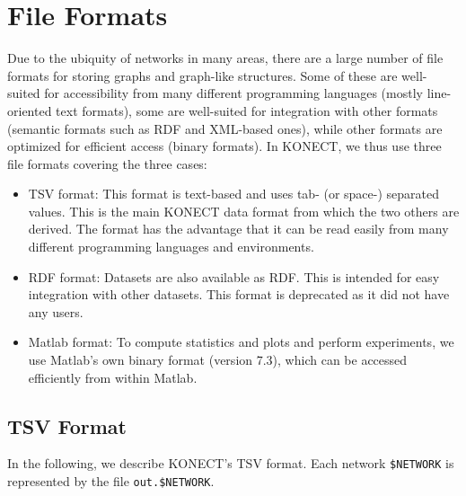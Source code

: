 \documentclass{article}
\begin{document}
\section{File Formats}
\label{sec:format}
Due to the ubiquity of networks in many areas, there are a large number
of file formats for storing graphs and graph-like structures.  Some of
these are well-suited for accessibility from many different programming
languages (mostly line-oriented text formats), some are well-suited for
integration with other formats (semantic formats such as RDF and
XML-based ones), while other formats are optimized for efficient access
(binary formats).  In KONECT, we thus use three file formats covering
the three cases:
\begin{itemize}
\item TSV format: This format is text-based and uses tab- (or space-) separated 
  values.  This is the main KONECT data format from which the two others
  are derived.  The format has the advantage that it can be read easily
  from many different programming languages and environments.
\item RDF format: Datasets are also available as RDF.  This is intended
  for easy integration with other datasets.  This format is deprecated
  as it did not have any users. 
\item Matlab format: To compute statistics and plots and perform
  experiments, we use Matlab's own binary format (version 7.3), which can be accessed
  efficiently from within Matlab.
\end{itemize}

\subsection{TSV Format}
In the following, we describe KONECT's TSV format.  Each network
\texttt{\$NETWORK} is represented by the file \texttt{out.\$NETWORK}. 
\end{document}
